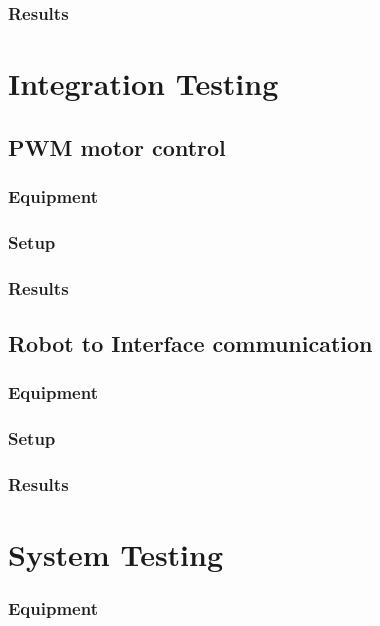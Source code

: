 \subsubsection{Results}
 
\section{Integration Testing}

\subsection{PWM motor control}
 
\subsubsection{Equipment}
 
\subsubsection{Setup}
 
\subsubsection{Results}
 
\subsection{Robot to Interface communication}

\subsubsection{Equipment}

\subsubsection{Setup}
 
\subsubsection{Results}
 
\section{System Testing}
 
\subsubsection{Equipment}

